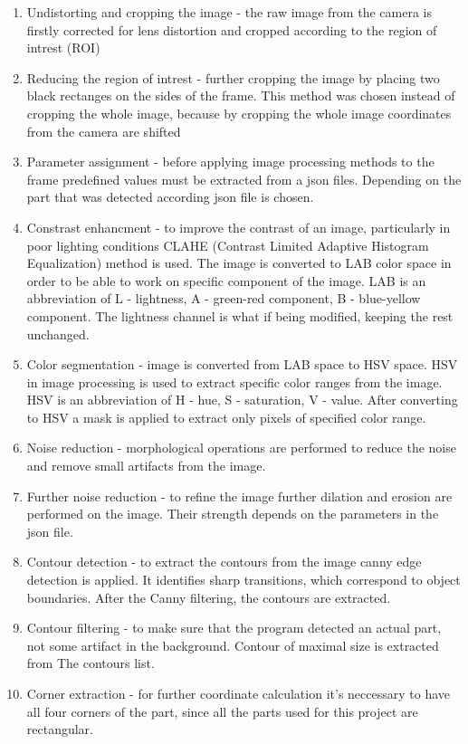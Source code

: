 \begin{enumerate}
    \item Undistorting and cropping the image -  the raw image from the camera is firstly 
    corrected for lens distortion and cropped according to the region of intrest (ROI)
    \item Reducing the region of intrest - further cropping the image by placing two black rectanges on the sides
    of the frame. This method was chosen instead of cropping the whole image, because
    by cropping the whole image coordinates from the camera are shifted
    \item Parameter assignment - before applying image processing methods to the frame
    predefined values must be extracted from a json files. Depending on the part that
    was detected according json file is chosen.
    \item Constrast enhancment - to improve the contrast of an image, particularly in
    poor lighting conditions CLAHE (Contrast Limited Adaptive Histogram Equalization)
    method is used. The image is converted to LAB color space in order to be able to work
    on specific component of the image. LAB is an abbreviation of L - lightness, A - green-red component, B - blue-yellow
    component. The lightness channel is what if being modified, keeping the rest unchanged.
    \item Color segmentation - image is converted from LAB space to HSV space. HSV in
    image processing is used to extract specific color ranges from the image. HSV is an
    abbreviation of H - hue, S - saturation, V - value. After converting to HSV a mask is
    applied to extract only pixels of specified color range.
    \item Noise reduction - morphological operations are performed to reduce the noise
    and remove small artifacts from the image.
    \item Further noise reduction - to refine the image further dilation and erosion are
    performed on the image. Their strength depends on the parameters in the json file.
    \item Contour detection - to extract the contours from the image canny edge detection
    is applied. It identifies sharp transitions, which correspond to object boundaries.
    After the Canny filtering, the contours are extracted.
    \item Contour filtering - to make sure that the program detected an actual part, not
    some artifact in the background. Contour of maximal size is extracted from The
    contours list.
    \item Corner extraction - for further coordinate calculation it's neccessary to
    have all four corners of the part, since all the parts used for this project are
    rectangular.
\end{enumerate}


